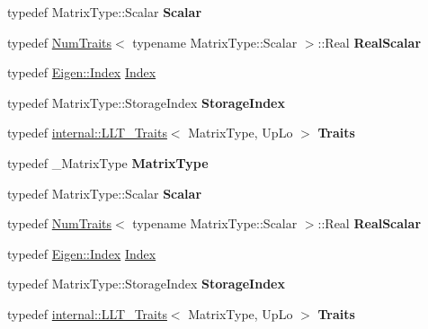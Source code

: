 \begin{DoxyCompactItemize}
typedef Matrix\+Type\+::\+Scalar {\bfseries Scalar}
\item 
\mbox{\label{group___cholesky___module_a83aa63243f80d1d99fe0d2a91a5a157f}} 
typedef \hyperlink{group___core___module_struct_eigen_1_1_num_traits}{Num\+Traits}$<$ typename Matrix\+Type\+::\+Scalar $>$\+::Real {\bfseries Real\+Scalar}
\item 
typedef \hyperlink{namespace_eigen_a62e77e0933482dafde8fe197d9a2cfde}{Eigen\+::\+Index} \hyperlink{group___cholesky___module_ac7a64274814fa76e8b1e9e945546037f}{Index}
\item 
\mbox{\label{group___cholesky___module_ae946bd1d4fb9bc01f4a51b9007a32c1a}} 
typedef Matrix\+Type\+::\+Storage\+Index {\bfseries Storage\+Index}
\item 
\mbox{\label{group___cholesky___module_a61954c19216610f6d6da9a816de03e2e}} 
typedef \hyperlink{struct_eigen_1_1internal_1_1_l_l_t___traits}{internal\+::\+L\+L\+T\+\_\+\+Traits}$<$ Matrix\+Type, Up\+Lo $>$ {\bfseries Traits}
\item 
\mbox{\label{group___cholesky___module_a51ef18ef9163d74028f6cb6d967a9242}} 
typedef \+\_\+\+Matrix\+Type {\bfseries Matrix\+Type}
\item 
\mbox{\label{group___cholesky___module_ac3e9cca0fd73cbe446f5ee562386a934}} 
typedef Matrix\+Type\+::\+Scalar {\bfseries Scalar}
\item 
\mbox{\label{group___cholesky___module_a83aa63243f80d1d99fe0d2a91a5a157f}} 
typedef \hyperlink{group___core___module_struct_eigen_1_1_num_traits}{Num\+Traits}$<$ typename Matrix\+Type\+::\+Scalar $>$\+::Real {\bfseries Real\+Scalar}
\item 
typedef \hyperlink{namespace_eigen_a62e77e0933482dafde8fe197d9a2cfde}{Eigen\+::\+Index} \hyperlink{group___cholesky___module_ac7a64274814fa76e8b1e9e945546037f}{Index}
\item 
\mbox{\label{group___cholesky___module_ae946bd1d4fb9bc01f4a51b9007a32c1a}} 
typedef Matrix\+Type\+::\+Storage\+Index {\bfseries Storage\+Index}
\item 
\mbox{\label{group___cholesky___module_a61954c19216610f6d6da9a816de03e2e}} 
typedef \hyperlink{struct_eigen_1_1internal_1_1_l_l_t___traits}{internal\+::\+L\+L\+T\+\_\+\+Traits}$<$ Matrix\+Type, Up\+Lo $>$ {\bfseries Traits}
\end{DoxyCompactItemize}
